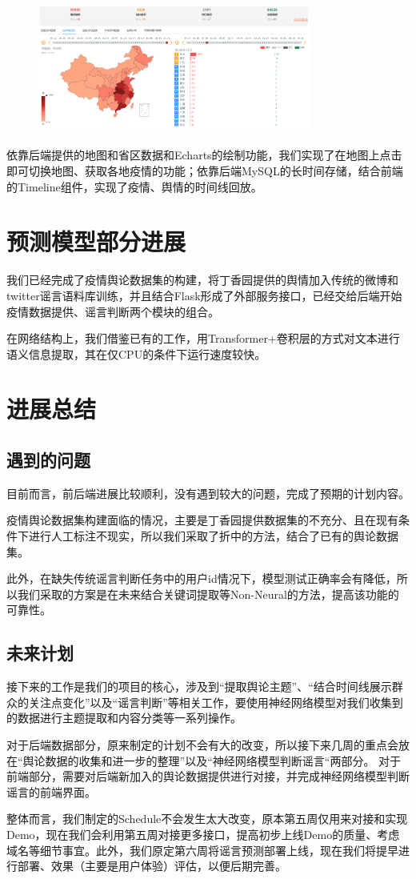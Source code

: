 \documentclass{article}
\begin{document}
\begin{figure}[htb]
\centering
\includegraphics[width=0.8\textwidth]{pic3.png}
\end{figure}

依靠后端提供的地图和省区数据和Echarts的绘制功能，我们实现了在地图上点击即可切换地图、获取各地疫情的功能；依靠后端MySQL的长时间存储，结合前端的Timeline组件，实现了疫情、舆情的时间线回放。


\section{预测模型部分进展}
我们已经完成了疫情舆论数据集的构建，将丁香园提供的舆情加入传统的微博和twitter谣言语料库训练，并且结合Flask形成了外部服务接口，已经交给后端开始疫情数据提供、谣言判断两个模块的组合。

在网络结构上，我们借鉴已有的工作，用Transformer+卷积层的方式对文本进行语义信息提取，其在仅CPU的条件下运行速度较快。

\section{进展总结}
\subsection{遇到的问题}
目前而言，前后端进展比较顺利，没有遇到较大的问题，完成了预期的计划内容。

疫情舆论数据集构建面临的情况，主要是丁香园提供数据集的不充分、且在现有条件下进行人工标注不现实，所以我们采取了折中的方法，结合了已有的舆论数据集。

此外，在缺失传统谣言判断任务中的用户id情况下，模型测试正确率会有降低，所以我们采取的方案是在未来结合关键词提取等Non-Neural的方法，提高该功能的可靠性。

\subsection{未来计划}
接下来的工作是我们的项目的核心，涉及到“提取舆论主题”、“结合时间线展示群众的关注点变化”以及“谣言判断”等相关工作，要使用神经网络模型对我们收集到的数据进行主题提取和内容分类等一系列操作。

对于后端数据部分，原来制定的计划不会有大的改变，所以接下来几周的重点会放在“舆论数据的收集和进一步的整理”以及“神经网络模型判断谣言“两部分。
对于前端部分，需要对后端新加入的舆论数据提供进行对接，并完成神经网络模型判断谣言的前端界面。

整体而言，我们制定的Schedule不会发生太大改变，原本第五周仅用来对接和实现Demo，现在我们会利用第五周对接更多接口，提高初步上线Demo的质量、考虑域名等细节事宜。此外，我们原定第六周将谣言预测部署上线，现在我们将提早进行部署、效果（主要是用户体验）评估，以便后期完善。
\end{document}
